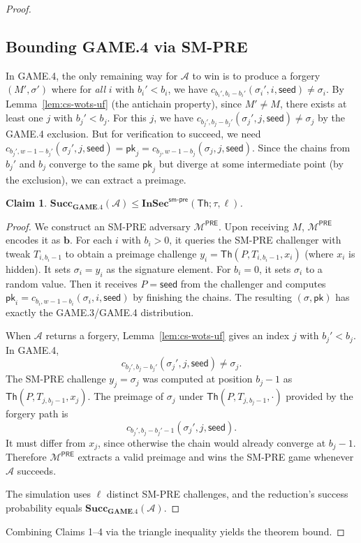 \documentclass[11pt,a4paper]{article}
\newtheorem{claim}[theorem]{Claim}
\newcommand{\Th}{\mathsf{Th}}
\newcommand{\pk}{\mathsf{pk}}
\newcommand{\PK}{\mathsf{pk}}
\newcommand{\seed}{\mathsf{seed}}
\newcommand{\InSec}[1]{\mathbf{InSec}^{\mathsf{#1}}}
\newcommand{\Succ}{\mathbf{Succ}}
\newcommand{\GAME}{\mathbf{GAME}}
\begin{document}
\begin{proof}
\subsection*{Bounding GAME.4 via SM-PRE}
In GAME.4, the only remaining way for $\mathcal{A}$ to win is to produce a forgery $(M',\sigma')$ where for \emph{all} $i$ with $b_i' < b_i$, we have $c_{b_i',b_i-b_i'}(\sigma_i',i,\seed) \neq \sigma_i$. By Lemma~\ref{lem:cs-wots-uf} (the antichain property), since $M' \neq M$, there exists at least one $j$ with $b_j' < b_j$. For this $j$, we have $c_{b_j',b_j-b_j'}(\sigma_j',j,\seed) \neq \sigma_j$ by the GAME.4 exclusion. But for verification to succeed, we need $c_{b_j', w-1-b_j'}(\sigma_j', j, \seed) = \pk_j = c_{b_j, w-1-b_j}(\sigma_j, j, \seed)$. Since the chains from $b_j'$ and $b_j$ converge to the same $\pk_j$ but diverge at some intermediate point (by the exclusion), we can extract a preimage.

\begin{claim}
$\Succ_{\GAME.4}(\mathcal{A}) \le \InSec{sm\text{-}pre}(\Th; \tau, \ell)$.
\end{claim}

\begin{proof}
We construct an SM-PRE adversary $\mathcal{M}^{\mathsf{PRE}}$. Upon receiving $M$, $\mathcal{M}^{\mathsf{PRE}}$ encodes it as $\mathbf{b}$. For each $i$ with $b_i > 0$, it queries the SM-PRE challenger with tweak $T_{i,b_i-1}$ to obtain a preimage challenge $y_i = \Th(P,T_{i,b_i-1},x_i)$ (where $x_i$ is hidden). It sets $\sigma_i = y_i$ as the signature element. For $b_i = 0$, it sets $\sigma_i$ to a random value. Then it receives $P = \seed$ from the challenger and computes $\pk_i = c_{b_i, w-1-b_i}(\sigma_i, i, \seed)$ by finishing the chains. The resulting $(\sigma,\PK)$ has exactly the GAME.3/GAME.4 distribution.

When $\mathcal{A}$ returns a forgery, Lemma~\ref{lem:cs-wots-uf} gives an index $j$ with $b_j' < b_j$. In GAME.4,
\[
c_{b_j',b_j-b_j'}(\sigma_j',j,\seed) \neq \sigma_j.
\]
The SM-PRE challenge $y_j=\sigma_j$ was computed at position $b_j-1$ as $\Th(P,T_{j,b_j-1},x_j)$. The preimage of $\sigma_j$ under $\Th(P,T_{j,b_j-1},\cdot)$ provided by the forgery path is
\[
c_{b_j', b_j-b_j'-1}(\sigma_j', j, \seed).
\]
It must differ from $x_j$, since otherwise the chain would already converge at $b_j-1$. Therefore $\mathcal{M}^{\mathsf{PRE}}$ extracts a valid preimage and wins the SM-PRE game whenever $\mathcal{A}$ succeeds.

The simulation uses $\ell$ distinct SM-PRE challenges, and the reduction's success probability equals $\Succ_{\GAME.4}(\mathcal{A})$.
\end{proof}

\vspace{4pt}
Combining Claims 1--4 via the triangle inequality yields the theorem bound.
\end{proof}
\end{document}
